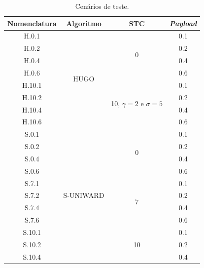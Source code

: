 \begin{table}[!htb]
\centering
\caption{Cenários de teste.}
\label{tab:cenariosTest}
\begin{tabular}{|c|c|c|c|}
\hline
Nomenclatura& Algoritmo & STC & \textit{Payload} \\
\hline
 H.0.1 & \multirow{8}{*}{HUGO} & \multirow{4}{*}{0} & 0.1 \\ \cline{1-1} \cline{4-4} 
 H.0.2  &                   &                   & 0.2 \\ \cline{1-1} \cline{4-4} 
 H.0.4 &                   &                   &  0.4 \\ \cline{1-1} \cline{4-4} 
 H.0.6 &                   &                   &  0.6\\ \cline{1-1} \cline{3-4} 
 H.10.1 &                   & \multirow{4}{*}{10, $\gamma = 2$ e $\sigma = 5$} &  0.1\\ \cline{1-1} \cline{4-4} 
 H.10.2&                   &                   &  0.2\\ \cline{1-1} \cline{4-4} 
 H.10.4&                   &                   &  0.4\\ \cline{1-1} \cline{4-4} 
 H.10.6&                   &                   &  0.6\\ \hline
 S.0.1 & \multirow{16}{*}{S-UNIWARD} & \multirow{4}{*}{0} & 0.1 \\ \cline{1-1} \cline{4-4} 
 S.0.2&                   &                   & 0.2 \\ \cline{1-1} \cline{4-4} 
 S.0.4&                   &                   &  0.4\\ \cline{1-1} \cline{4-4} 
 S.0.6&                   &                   &  0.6\\ \cline{1-1} \cline{3-4} 
 S.7.1 &                   & \multirow{4}{*}{7} &  0.1\\ \cline{1-1} \cline{4-4} 
 S.7.2&                   &                   &  0.2\\ \cline{1-1} \cline{4-4} 
 S.7.4&                   &                   &  0.4\\ \cline{1-1} \cline{4-4} 
 S.7.6&                   &                   &  0.6\\ \cline{1-1} \cline{3-4} 
 S.10.1 &                   & \multirow{4}{*}{10} & 0.1 \\ \cline{1-1} \cline{4-4} 
 S.10.2&                   &                   &  0.2\\ \cline{1-1} \cline{4-4} 
 S.10.4&                   &                   &  0.4\\ \cline{1-1} \cline{4-4} 

\end{tabular}
\end{table}
